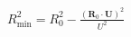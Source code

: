 \documentclass[border=2.5pt]{standalone}
\begin{document}
$\displaystyle R_{\min}^2=R_0^2-\frac{(\bm R_0\cdot\bm U)^2}{U^2}$
\end{document}
